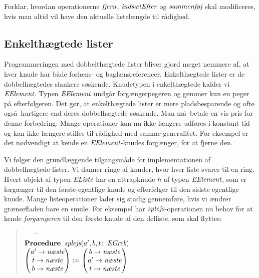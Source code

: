  \begin{exerc}
   Forklar, hvordan operationerne $\operatorname{\emph{fjern}}$, $\operatorname{\emph{indsætEfter}}$ og $\operatorname{\emph{sammenføj}}$ skal modificeres, hvis man altid vil have den aktuelle listelængde til rådighed.
 \end{exerc}

\subsection{Enkelthægtede lister}

Programmeringen med dobbelthægtede lister bliver gjord meget nemmere af, at hver knude har både forlæns- og baglænsreferencer.
Enkelthægtede lister er de dobbelhægtedes slankere søskende.
Knudetypen i enkelthægtede kalder vi $\operatorname{\emph{EElement}}$.
Typen $\operatorname{\emph{EElement}}$ undgår forgængerpegeren og gemmer kun en peger på efterfølgeren.
Det gør, at  enkelthægtede lister er mere pladsbesparende og ofte også hurtigere end deres dobbelhægtede søskende.
Man må betale en vis pris for denne forbedring:
Mange operationer kan nu ikke længere udføres i konstant tid og kan ikke længere stilles til rådighed med samme generalitet.
For eksempel er det nødvendigt at kende en $\operatorname{\emph{EElement}}$-knudes forgænger, for at fjerne den.

Vi følger den grundlæggende tilgangsmåde for implementationen af dobbelhægtede lister.
Vi danner ringe af knuder, hvor hver liste svarer til en ring.
Hvert objekt af typen $\operatorname{\emph{EListe}}$ har en attrapknude $h$ af typen $\operatorname{\emph{EElement}}$, som er forgænger til den første egentlige knude og efterfølger til den sidste egentlige knude.
Mange listeoperationer lader sig stadig gennemføre, hvis vi ændrer grænsefladen bare en smule.
For eksempel har $\operatorname{\emph{splejs}}$-operationen nu behov for at kende \emph{forgængeren} til den første knude af den delliste, som skal flyttes:

\begin{quote}
  \begin{tabbing}
    ~~~~\=\kill
    \\
    $\operatorname{\textbf{Procedure~}}\operatorname{\emph{splejs}}(a',b,t\colon \operatorname{\emph{EGreb}})$\\
    \>$\begin{pmatrix}
      a'\rightarrow\operatorname{\emph{næste}}\\
      t\rightarrow\operatorname{\emph{næste}}\\
      b\rightarrow\operatorname{\emph{næste}}
    \end{pmatrix} := 
    \begin{pmatrix}
      b\rightarrow\operatorname{\emph{næste}}\\
      a'\rightarrow\operatorname{\emph{næste}}\\
      t\rightarrow\operatorname{\emph{næste}}
    \end{pmatrix} 
    $
  \end{tabbing}
\end{quote}

